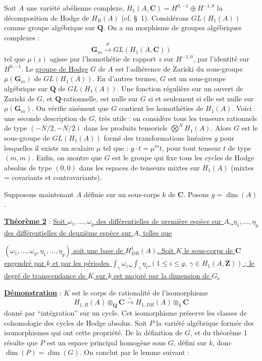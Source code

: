 \documentclass[10pt,a4paper]{article}
\newcommand{\Z}{\mathbf Z}
\newcommand{\Q}{\mathbf Q}
\newcommand{\C}{\mathbf C}
\newcommand{\Gm}{\mathbf G_m}
\begin{document}
Soit $A$ une variété abélienne complexe, $H_1(A,\C)=H^{0,-1}\oplus H^{-1,0}$ la décomposition de Hodge de $H_B(A)$ (cf. \S\ 1). Considérons $GL(H_1(A))$ comme groupe algébrique sur $\Q$. On a un morphisme de groupes algébriques complexes :
\[
\Gm\xrightarrow{\mu}GL(H_1(A,\C))
\]
tel que $\mu(z)$ agisse par l'homothétie de rapport $z$ sur $H^{-1,0}$, par l'identité sur $H^{0,-1}$. Le \uline{groupe de Hodge} $G$ de $A$ est l'adhérence de Zariski du sous-groupe $\mu(\Gm)$ de $GL(H_1(A))$. En d'autres termes, $G$ est un sous-groupe algébrique sur $\Q$ de $GL(H_1(A))$. Une fonction régulière sur un ouvert de Zariski de $G$, et $\Q$-rationnelle, est nulle sur $G$ si et seulement si elle est nulle sur $\mu(\Gm)$. On vérifie aisément que $G$ contient les homothéties de $H_1(A)$. Voici une seconde description de $G$, très utile : on considère tous les tenseurs rationnels de type $(-N/2,-N/2)$ dans les produits tensoriels $\bigotimes^N H_1(A)$. Alors $G$ est le sous-groupe de $GL(H_1(A))$ formé des transformations linéaires $g$ pour lesquelles il existe un scalaire $\mu$ tel que : $g\cdot t=\mu^m t$, pour tout tenseur $t$ de type $(m,m)$. Enfin, on montre que $G$ est le groupe qui fixe tous les cycles de Hodge absolus de type $(0,0)$ dans les espaces de tenseurs mixtes sur $H_1(A)$ (mixtes = covariants et contravariants).

Supposons maintenant $A$ définie sur un sous-corps $k$ de $\C$. Posons $g=\dim(A)$.

\noindent\uline{\textbf{Théorème 2}} : \uline{Soit $\omega_1,\ldots,\omega_g$ des différentielles de première espèce sur $A$, $\eta_1,\ldots,\eta_g$ des différentielles de deuxième espèce sur $A$, telles que}


\newpage


\uline{$(\omega_1,\ldots,\omega_g,\eta_1,\ldots,\eta_g)$ soit une base de $H^1_{DR}(A)$. Soit $K$ le sous-corps de $\C$ engendré par $k$ et par les périodes $\int_\gamma\omega_i$, $\int_\gamma\eta_i$ $(1\le i\le g,\ \gamma\in H_1(A,\Z))$ ; le degré de transcendance de $K$ sur $k$ est majoré par la dimension de $G$.}

\noindent\uline{\textbf{Démonstration}} : $K$ est le corps de rationalité de l'isomorphisme
\[
H_{1,B}(A)\otimes_{\Q}\C\xrightarrow{\sim}H_{1,DR}(A)\otimes_k\C
\]
donné par ``intégration'' sur un cycle. Cet isomorphisme préserve les classes de cohomologie des cycles de Hodge absolus. Soit $P$ la variété algébrique formée des isomorphismes qui ont cette propriété. De la définition de $G$, et du théorème 1 résulte que $P$ est un espace principal homogène sous $G$, défini sur $k$, donc $\dim(P)=\dim(G)$. On conclut par le lemme suivant :
\end{document}
